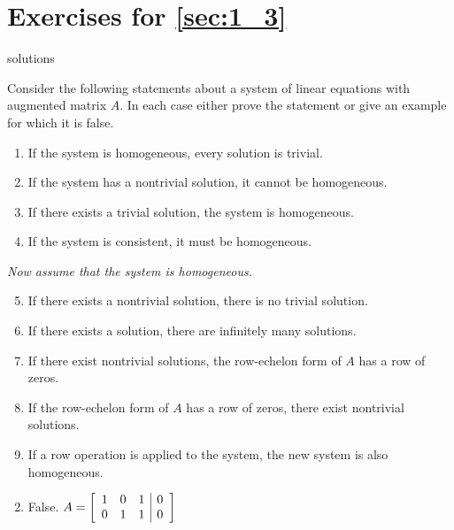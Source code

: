 \section*{Exercises for \ref{sec:1_3}}

\begin{Filesave}{solutions}
\end{Filesave}

\begin{multicols}{2}
\begin{ex}
Consider the following statements about a system of linear equations with augmented matrix $A$. In each case either prove the statement or give an example for which it is false.

\begin{enumerate}[label={\alph*.}]
\item If the system is homogeneous, every solution is trivial.

\item If the system has a nontrivial solution, it cannot be homogeneous.

\item If there exists a trivial solution, the system is homogeneous.

\item If the system is consistent, it must be homogeneous.
\end{enumerate}

\noindent\textit{Now assume that the system is homogeneous.}

\begin{enumerate}[label={\alph*.}]
\setcounter{enumi}{4}
\item If there exists a nontrivial solution, there is no trivial solution.

\item If there exists a solution, there are infinitely many solutions.

\item If there exist nontrivial solutions, the row-echelon form of $A$ has a row of zeros.

\item If the row-echelon form of $A$ has a row of zeros, there exist nontrivial solutions.

\item If a row operation is applied to the system, the new system is also homogeneous.

\end{enumerate}
\begin{sol}
\begin{enumerate}[label={\alph*.}]
\setcounter{enumi}{1}
\item  False. 
$A = 
\left[ \begin{array}{rrr|r}
	1 & 0 & 1 & 0 \\
	0 & 1 & 1 & 0	
\end{array} \right]$


\end{enumerate}
\end{sol}
\end{ex}
\end{multicols}
